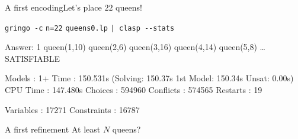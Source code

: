 \begin{frame}[fragile]{A first encoding}{Let's place \alert{$22$} queens!}
\begin{block}{\alert<1>{\lstinline{gringo -c} \alert{\lstinline{n=22}} \lstinline{queens0.lp} \lstinline{| clasp --stats}}}
\vspace*{-3mm}
\pause\footnotesize%
\begin{semiverbatim}
Answer: 1
queen(1,10) queen(2,6) queen(3,16) queen(4,14) queen(5,8) \dots{}
SATISFIABLE

Models      : 1+
\alert<2>{Time        : 150.531s} (Solving: 150.37s 1st Model: 150.34s Unsat: 0.00s)
CPU Time    : 147.480s
Choices     : 594960
\alert<2>{Conflicts   : 574565}
Restarts    : 19

Variables   : 17271
Constraints : 16787
\end{semiverbatim}
\end{block}
\end{frame}
\begin{frame}[fragile]{A first refinement}
  At least $N$ queens?\hfill  \alert<4>{   }
\end{frame}
